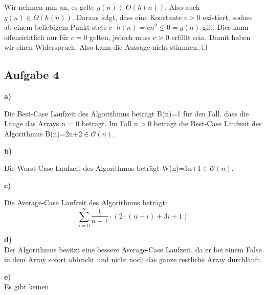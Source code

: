 \documentclass[a4paper,graphics,11pt]{article}
\newcommand{\aufgabe}[1]{\subsection*{Aufgabe #1}}
\begin{document}
Wir nehmen nun an, es gelte $g(n) \in \Theta(h(n))$. Also auch $g(n) \in \Omega(h(n))$. Daraus folgt, dass eine Konstante
$c > 0$ existiert, sodass ab einem beliebigem Punkt stets $c \cdot h(n) = cn^2 \leq 0 = g(n)$ gilt. Dies kann offensichtlich
nur für $c = 0$ gelten, jedoch muss $c > 0$ erfüllt sein. Damit haben wir einen Widerspruch. Also kann die Aussage nicht stimmen.
$\hfill\square$

\newpage
\aufgabe{4}
\textbf{a)}

Die Best-Case Laufzeit des Algorithmus beträgt B(n)=1 für den Fall, dass die Länge das Arrays n = 0 beträgt. Im Fall $n > 0$ beträgt die Best-Case Laufzeit des Algorithmus B(n)=2n+2$\in \mathcal{O}(n)$.

\textbf{b)}

Die Worst-Case Laufzeit des Algorithmus beträgt W(n)=3n+1$\in \mathcal{O}(n)$.

\textbf{c)}

Die Average-Case Laufzeit des Algorithmus beträgt:
$$
\sum_{i=0}^{n} \frac{1}{n+1} \cdot (2 \cdot (n-i)+3i+1)
$$

\textbf{d)}\\



Der Algorithmus besitzt eine bessere Average-Case Laufzeit, da er bei einem False in dem Array sofort abbricht und nicht noch das ganze restliche Array durchläuft.

\textbf{e)}\\

Es gibt keinen
\end{document}
